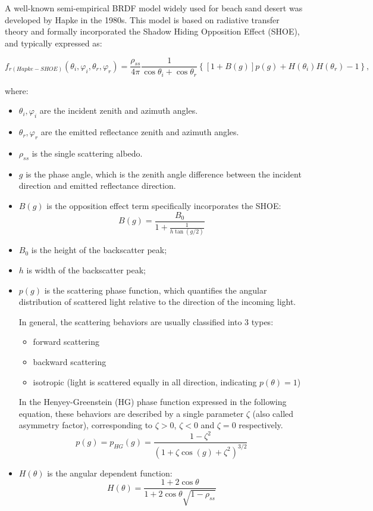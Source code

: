 A well-known semi-empirical BRDF model widely used for beach sand desert was developed by Hapke in the 1980s\cite{1984_Hapke,2022_Wise,2023_Zhuang}.
This model is based on radiative transfer theory and formally incorporated the Shadow Hiding Opposition Effect (SHOE), and typically expressed as:

\begin{equation}
    f_{r(Hapke-SHOE)}(\theta_i, \varphi_i, \theta_r, \varphi_r) = \frac{\rho_{ss}}{4 \pi}%
    \frac{1}{\cos\theta_i + \cos\theta_r}%
    \left\{
    \left[1 + B(g)\right] p(g)%
    + H(\theta_i)H(\theta_r)%
    - 1
    \right\},
\end{equation}

where:
\begin{itemize}
    \item $\theta_i, \varphi_i$ are the incident zenith and azimuth angles.
    \item $\theta_r, \varphi_r$ are the emitted reflectance zenith and azimuth angles.
    \item $\rho_{ss}$ is the single scattering albedo.
    \item $g$ is the phase angle, which is the zenith angle difference between the incident direction and emitted reflectance direction.
    \item $B(g)$ is the opposition effect term specifically incorporates the SHOE:
          \[
              B(g) = \frac{B_0}{1 + \frac{1}{h \tan(g/2)}}
          \]
    \item $B_0$ is the height of the backscatter peak;
    \item $h$ is width of the backscatter peak;
    \item $p(g)$ is the scattering phase function, which quantifies the angular distribution of scattered light relative to the direction of the incoming light.

          In general, the scattering behaviors are usually classified into 3 types:
          \begin{itemize}
              \item forward scattering
              \item backward  scattering
              \item isotropic (light is scattered equally in all direction, indicating $p(\theta) = 1$)
          \end{itemize}
          In the Henyey-Greenstein (HG) phase function expressed in the following equation, these behaviors are described by a single parameter $\zeta$ (also called asymmetry factor), corresponding to $\zeta > 0$, $\zeta < 0$ and $\zeta = 0$ respectively.
          \[
              p(g) = p_{HG}(g) =\frac{1 - \zeta^2}{\left(1 + \zeta \cos(g) + \zeta^2\right)^{3/2}}
          \]

    \item $H(\theta)$ is the angular dependent function:
          \[
              H(\theta) = \frac{1 + 2\cos\theta}{1 + 2\cos\theta \sqrt{1 - \rho_{ss}} }
          \]
\end{itemize}
